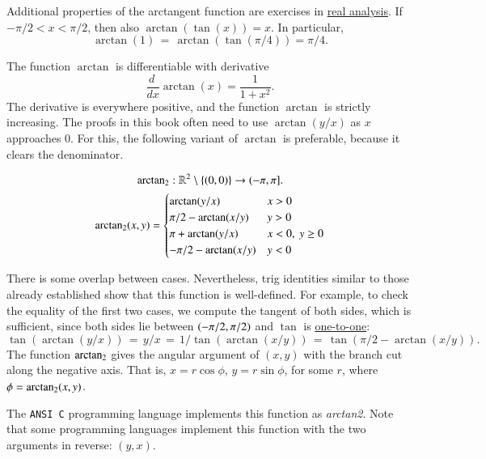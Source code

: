 Additional properties of the arctangent function are exercises in \hyperref[back:analysis]{real analysis}.
If $-\pi/2 < x < \pi/2$, then also $\arctan(\tan(x)) = x$. In
particular,
    \begin{equation}
   \arctan(1) \hyperref[lemma:tan-pi4]{\,=\,} \arctan(\tan(\pi/4)) = \pi/4.
   \end{equation}


The function $\arctan$ is differentiable with derivative%
    $$\frac{d\phantom{~}} {dx} \arctan(x) = \frac{1}{1 + x^2}.$$
The derivative is everywhere positive, and the function $\arctan$ is
strictly increasing.
%
The proofs in this book often need to use $\arctan(y/x)$ as  $x$ approaches $0$.
For this, the following variant of $\arctan$ is preferable, because it clears the denominator.


\begin{definition}[$\atn$]\label{def:atn}
$$
{\operatorname{arctan_2}}: \mathbb{R}^2\setminus\{(0,0)\} \to (-\pi,\pi].
$$
$$
{\operatorname{arctan_2}}(x,y) = \begin{cases}
   \arctan(y/x) & x > 0\\
   \pi/2- \arctan(x/y) & y > 0 \\
   \pi + \arctan(y/x) & x< 0,\  y\ge 0\\
   -\pi/2- \arctan(x/y) & y< 0 \\
\end{cases}
$$
\end{definition}
%
%


There is some overlap between cases. Nevertheless, trig identities similar to those already established show
that this function is well-defined.  For example, to check the equality of the
first two cases, we compute the tangent of both sides, which is sufficient, since both sides lie between $(-\pi/2,\pi/2)$ and $\tan$ is \hyperref[lemma:tan-monotone]{one-to-one}:
$$
\tan(\arctan(y/x)) \hyperref[def:arctan]{\,=\,} y/x \hyperref[def:arctan]{\,=\,} 
1/\tan(\arctan(x/y)) \hyperref[lemma:cos-sin]{\,=\,} \tan(\pi/2 - \arctan(x/y)).
$$
The function $\atn$ gives the
angular argument of $(x,y)$ with the branch cut along the negative axis.
That is, $x = r\cos\phi$, $y=r\sin\phi$, for some $r$, where $\phi={\operatorname{arctan_2}}(x,y)$.

The {\tt ANSI C} programming language implements this function as {\it arctan2}. 
Note that some programming languages implement this function with the two arguments in reverse: $(y,x)$.
%
%
%
%


